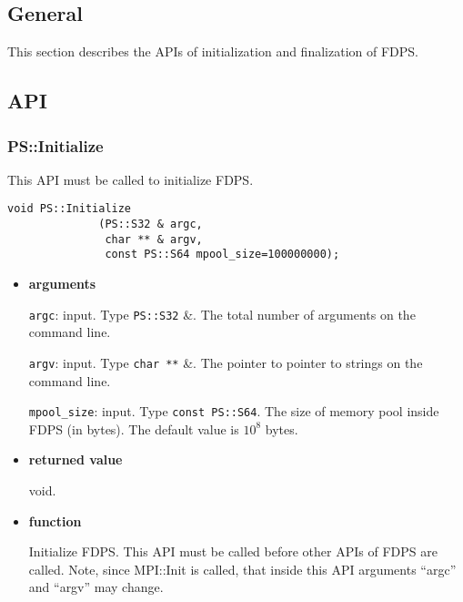 \subsection{General}


This section describes the APIs of initialization and finalization of FDPS.

\subsection{API}

\subsubsection{PS::Initialize}

This API must be called to initialize FDPS.

\begin{screen}
\begin{verbatim}
void PS::Initialize
              (PS::S32 & argc,
               char ** & argv,
               const PS::S64 mpool_size=100000000);
\end{verbatim}
\end{screen}

\begin{itemize}

\item {\bf arguments}

\texttt{argc}: input. Type \texttt{PS::S32} \&. The total number of arguments on the command line.

\texttt{argv}: input. Type \texttt{char **} \&. The pointer to pointer to strings on the command line.

\texttt{mpool\_size}: input. Type \texttt{const PS::S64}. The size of memory pool inside FDPS (in bytes). The default value is $10^{8}$ bytes. 

\item {\bf returned value}

void.

\item {\bf function}

  Initialize FDPS. This API must be called before other APIs of FDPS
  are called. Note, since MPI::Init is called, that inside this API
  arguments ``argc'' and ``argv'' may change.
  

\end{itemize}

